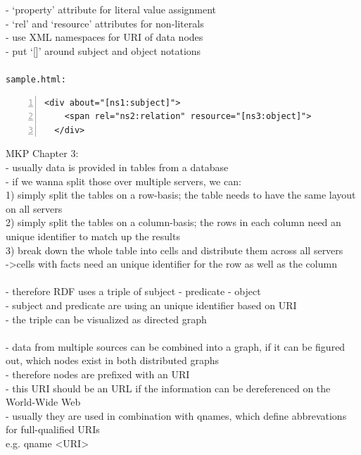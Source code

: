 - `property' attribute for literal value assignment \\
- `rel' and `resource' attributes for non-literals \\
- use XML namespaces for URI of data nodes \\
- put `[]' around subject and object notations \\
\\
\texttt{sample.html:}
\begin{lstlisting}[basicstyle=\ttfamily,numbers=left,numberstyle=\footnotesize\ttfamily,backgroundcolor=\color{sourcegray}]
  <div about="[ns1:subject]">
    <span rel="ns2:relation" resource="[ns3:object]">
  </div>
\end{lstlisting}

MKP Chapter 3: \\
- usually data is provided in tables from a database \\
- if we wanna split those over multiple servers, we can: \\
  1) simply split the tables on a row-basis; the table needs to have the same layout on all servers \\
	2) simply split the tables on a column-basis; the rows in each column need an unique identifier to match up the results \\
	3) break down the whole table into cells and distribute them across all servers \\
	 -\textgreater cells with facts need an unique identifier for the row as well as the column \\
\\
- therefore RDF uses a triple of subject - predicate - object \\
- subject and predicate are using an unique identifier based on URI \\
- the triple can be visualized as directed graph \\
\\
- data from multiple sources can be combined into a graph, if it can be figured out, which nodes exist in both distributed graphs \\
- therefore nodes are prefixed with an URI \\
- this URI should be an URL if the information can be dereferenced on the World-Wide Web \\
- usually they are used in combination with qnames, which define abbrevations for full-qualified URIs \\
   e.g. qname \textless URI\textgreater \\
